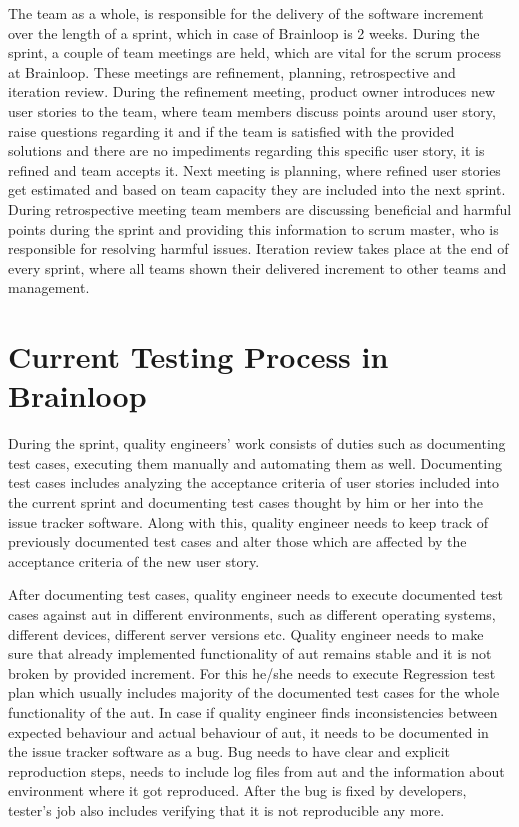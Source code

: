 \par
The team as a whole, is responsible for the delivery of the software increment over the length of a sprint, which in case of Brainloop is 2 weeks. During the sprint, a couple of team meetings are held, which are vital for the scrum process at Brainloop. These meetings are refinement, planning, retrospective and iteration review. During the refinement meeting, product owner introduces new user stories to the team, where team members discuss points around user story, raise questions regarding it and if the team is satisfied with the provided solutions and there are no impediments regarding this specific user story, it is refined and team accepts it. Next meeting is planning, where refined user stories get estimated and based on team capacity they are included into the next sprint. During retrospective meeting team members are discussing beneficial and harmful points during the sprint and providing this information to scrum master, who is responsible for resolving harmful issues. Iteration review takes place at the end of every sprint, where all teams shown their delivered increment to other teams and management.

\section{Current Testing Process in Brainloop}

\par
During the sprint, quality engineers' work consists of duties such as documenting test cases, executing them manually and automating them as well. Documenting test cases includes analyzing the acceptance criteria of user stories included into the current sprint and documenting test cases thought by him or her into the issue tracker software. Along with this, quality engineer needs to keep track of previously documented test cases and alter those which are affected by the acceptance criteria of the new user story.

\par
After documenting test cases, quality engineer needs to execute documented test cases against \acrlong{aut} in different environments, such as different operating systems, different devices, different server versions etc. Quality engineer needs to make sure that already implemented functionality of \acrlong{aut} remains stable and it is not broken by provided increment. For this he/she needs to execute Regression test plan which usually includes majority of the documented test cases for the whole functionality of the \acrlong{aut}. In case if quality engineer finds inconsistencies between expected behaviour and actual behaviour of \acrlong{aut}, it needs to be documented in the issue tracker software as a bug. Bug needs to have clear and explicit reproduction steps, needs to include log files from \acrlong{aut} and the information about environment where it got reproduced. After the bug is fixed by developers, tester's job also includes verifying that it is not reproducible any more.

